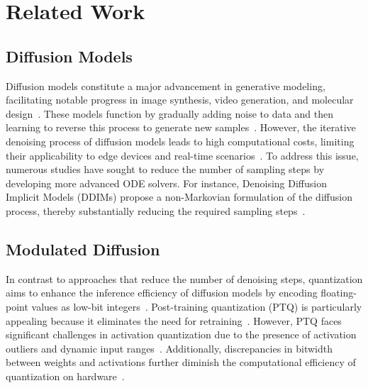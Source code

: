 \section{Related Work}
\subsection{Diffusion Models}
Diffusion models constitute a major advancement in generative modeling, facilitating notable progress in image synthesis, video generation, and molecular design~\citep{ho2020denoising, dhariwal2021diffusion, croitoru2022vision}. These models function by gradually adding noise to data and then learning to reverse this process to generate new samples~\citep{song2020score}.
However, the iterative denoising process of diffusion models leads to high computational costs, limiting their applicability to edge devices and real-time scenarios~\citep{zheng2025diffusion,ho2020denoising}. To address this issue, numerous studies have sought to reduce the number of sampling steps by developing more advanced ODE solvers. For instance, Denoising Diffusion Implicit Models (DDIMs) propose a non-Markovian formulation of the diffusion process, thereby substantially reducing the required sampling steps~\citep{song2020denoising}.


\subsection{Modulated Diffusion}
In contrast to approaches that reduce the number of denoising steps, quantization aims to enhance the inference efficiency of diffusion models by encoding floating-point values as low-bit integers~\citep{nagel2021white, yang2019quantization}. Post-training quantization (PTQ) is particularly appealing because it eliminates the need for retraining~\citep{li2021brecq}. However, PTQ faces significant challenges in activation quantization due to the presence of activation outliers and dynamic input ranges~\citep{li2023q, wang2024towards, huang2024tfmq, shang2023post, he2023ptqd, zhao2024vidit, xiao2023smoothquant, feng2024mpq}. Additionally, discrepancies in bitwidth between weights and activations further diminish the computational efficiency of quantization on hardware~\citep{gope2020high}.

